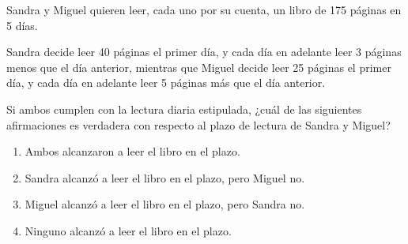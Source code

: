 \begin{problem}
    Sandra y Miguel quieren leer, cada uno por su cuenta, un libro de 175 páginas en 5 días.

    Sandra decide leer 40 páginas el primer día, y cada día en adelante leer 3 páginas menos que el día anterior, mientras que Miguel decide leer 25 páginas el primer día, y cada día en adelante leer 5 páginas más que el día anterior.

    Si ambos cumplen con la lectura diaria estipulada, ¿cuál de las siguientes afirmaciones es verdadera con respecto al plazo de lectura de Sandra y Miguel?

    \begin{enumerate}[label=\Alph*.]
        \item Ambos alcanzaron a leer el libro en el plazo.
        \item Sandra alcanzó a leer el libro en el plazo, pero Miguel no.
        \item Miguel alcanzó a leer el libro en el plazo, pero Sandra no.
        \item Ninguno alcanzó a leer el libro en el plazo.
    \end{enumerate}
\end{problem}
